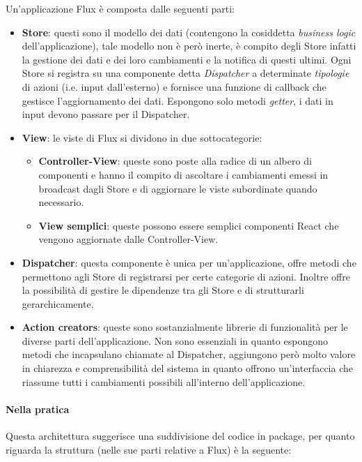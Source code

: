 Un'applicazione Flux è composta dalle seguenti parti:

\begin{itemize}
\item \textbf{Store}: questi sono il modello dei dati (contengono la cosiddetta \textit{business
logic} dell'applicazione), tale modello non è però inerte, è compito degli Store infatti la
gestione dei dati e dei loro cambiamenti e la notifica di questi ultimi. Ogni Store si registra
su una componente detta \textit{Dispatcher} a determinate \textit{tipologie} di azioni (i.e.
input dall'esterno) e fornisce una funzione di callback che gestisce l'aggiornamento dei dati.
Espongono solo metodi \textit{getter}, i dati in input devono passare per il Dispatcher.
\item \textbf{View}: le viste di Flux si dividono in due sottocategorie:
	\begin{itemize}
	\item \textbf{Controller-View}: queste sono poste alla radice di un albero di componenti
	e hanno il compito di ascoltare i cambiamenti emessi in broadcast dagli Store e di aggiornare
	le viste subordinate quando necessario.
	\item \textbf{View semplici}: queste possono essere semplici componenti React che vengono
	aggiornate dalle Controller-View.
	\end{itemize}
\item \textbf{Dispatcher}: questa componente è unica per un'applicazione, offre metodi
che permettono agli Store di registrarsi per certe categorie di azioni. Inoltre offre la
possibilità di gestire le dipendenze tra gli Store e di strutturarli gerarchicamente.
\item \textbf{Action creators}: queste sono sostanzialmente librerie di funzionalità per le
diverse parti dell'applicazione. Non sono essenziali in quanto espongono metodi che
incapsulano chiamate al Dispatcher, aggiungono però molto valore in chiarezza e
comprensibilità del sistema in quanto offrono un'interfaccia che riassume tutti i cambiamenti
possibili all'interno dell'applicazione.
\end{itemize}

\paragraph{Nella pratica}
Questa architettura suggerisce una suddivisione del codice in package, per quanto riguarda
\fiscoloMobile{} la struttura (nelle sue parti relative a Flux) è la seguente:

